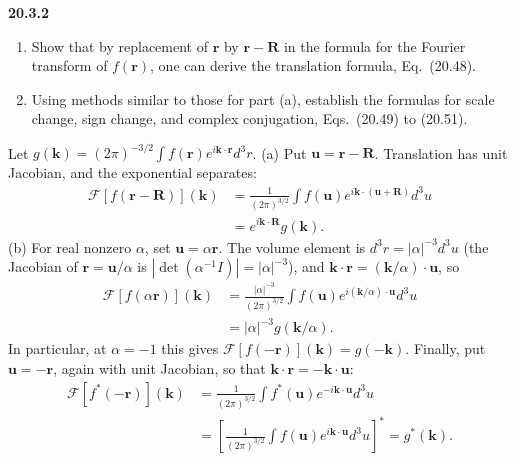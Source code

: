 \par\bigskip
\noindent\textbf{20.3.2}
\begin{enumerate}
\item[(a)] Show that by replacement of $\mathbf{r}$ by
$\mathbf{r}-\mathbf{R}$ in the formula for the Fourier transform
of $f(\mathbf{r})$, one can derive the translation formula,
Eq.~(20.48).
\item[(b)] Using methods similar to those for part (a), establish
the formulas for scale change, sign change, and complex
conjugation, Eqs.~(20.49) to (20.51).
\end{enumerate}
\solution
Let
$g(\mathbf k)=(2\pi)^{-3/2}\int f(\mathbf r)e^{i\mathbf k\cdot\mathbf r}d^3r$.
(a) Put $\mathbf u=\mathbf r-\mathbf R$. Translation has unit
Jacobian, and the exponential separates:
\begin{align*}
\mathcal F[f(\mathbf r-\mathbf R)](\mathbf k)
&=\frac1{(2\pi)^{3/2}}\int f(\mathbf u)
e^{i\mathbf k\cdot(\mathbf u+\mathbf R)}d^3u\\
&=\boxed{e^{i\mathbf k\cdot\mathbf R}g(\mathbf k)}.
\end{align*}
(b) For real nonzero $\alpha$, set $\mathbf u=\alpha\mathbf r$.
The volume element is $d^3r=|\alpha|^{-3}d^3u$ (the Jacobian of
$\mathbf r=\mathbf u/\alpha$ is $|\det(\alpha^{-1}I)|=|\alpha|^{-3}$),
and $\mathbf k\cdot\mathbf r=(\mathbf k/\alpha)\cdot\mathbf u$, so
\begin{align*}
\mathcal F[f(\alpha\mathbf r)](\mathbf k)
&=\frac{|\alpha|^{-3}}{(2\pi)^{3/2}}\int f(\mathbf u)
e^{i(\mathbf k/\alpha)\cdot\mathbf u}d^3u\\
&=\boxed{|\alpha|^{-3}g(\mathbf k/\alpha)}.
\end{align*}
In particular, at $\alpha=-1$ this gives
$\mathcal F[f(-\mathbf r)](\mathbf k)=g(-\mathbf k)$.
Finally, put $\mathbf u=-\mathbf r$, again with unit Jacobian,
so that $\mathbf k\cdot\mathbf r=-\mathbf k\cdot\mathbf u$:
\begin{align*}
\mathcal F[f^*(-\mathbf r)](\mathbf k)
&=\frac1{(2\pi)^{3/2}}\int f^*(\mathbf u)e^{-i\mathbf k\cdot\mathbf u}d^3u\\
&=\left[\frac1{(2\pi)^{3/2}}\int f(\mathbf u)e^{i\mathbf k\cdot\mathbf u}d^3u\right]^*
=\boxed{g^*(\mathbf k)}.
\end{align*}

